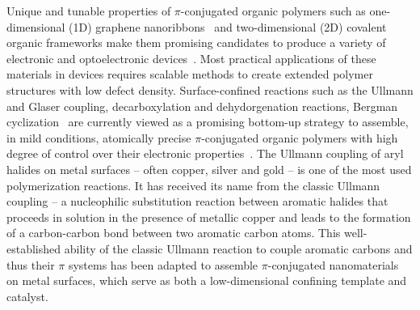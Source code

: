\documentclass[%
 reprint,
 amsmath,amssymb,
 aps,
prb,
floatfix,
]{revtex4-2}
\newcommand{\lock}{\color{red}}
\newcommand{\lock}{\color{black}}
\newcommand{\comm}{\color{ForestGreen}} %
\begin{document}
{\lock


Unique and tunable properties of $\pi$-conjugated organic polymers such as one-dimensional (1D) graphene nanoribbons~\cite{ullmann_106, ullmann_45, ullmann_107, ullmann_101}
and two-dimensional (2D) covalent organic frameworks 
make them promising candidates to produce a variety of electronic and optoelectronic devices~\cite{ullmann_113, ullmann_114}.
%
Most practical applications of these materials in devices requires scalable methods to create extended polymer structures with low defect density.
%
Surface-confined reactions such as the Ullmann and Glaser coupling, decarboxylation and dehydorgenation reactions, Bergman cyclization~\cite{ullmann_140}
are currently viewed as a promising bottom-up strategy to assemble, in mild conditions, atomically precise $\pi$-conjugated organic polymers with high degree of control over their electronic properties~\cite{ullmann_33}. 
%
%
The Ullmann coupling of aryl halides on metal surfaces -- often copper, silver and gold -- is one of the most used polymerization reactions. It has received its name from the classic Ullmann coupling -- a nucleophilic substitution reaction between aromatic halides that proceeds in solution in the presence of metallic copper and leads to the formation of a carbon-carbon bond between two aromatic carbon atoms. 
This well-established ability of the classic Ullmann reaction to couple aromatic carbons and thus their $\pi$ systems has been adapted to assemble $\pi$-conjugated nanomaterials on metal surfaces, which serve as both a low-dimensional confining template and catalyst.

}
\end{document}

